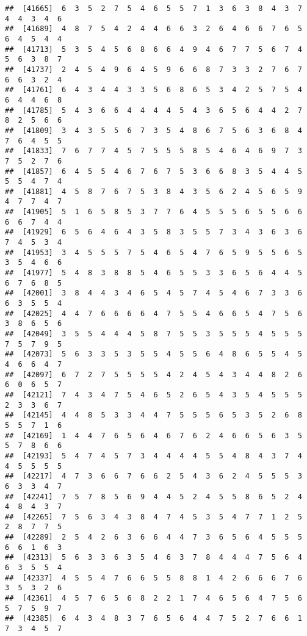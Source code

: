 \documentclass[
]{book}
\begin{document}
\begin{verbatim}
##  [41665]  6  3  5  2  7  5  4  6  5  5  7  1  3  6  3  8  4  3  7  4  4  3  4  6
##  [41689]  4  8  7  5  4  2  4  4  6  6  3  2  6  4  6  6  7  6  5  6  4  5  4  4
##  [41713]  5  3  5  4  5  6  8  6  6  4  9  4  6  7  7  5  6  7  4  5  6  3  8  7
##  [41737]  2  4  5  4  9  6  4  5  9  6  6  8  7  3  3  2  7  6  7  6  6  3  2  4
##  [41761]  6  4  3  4  4  3  3  5  6  8  6  5  3  4  2  5  7  5  4  6  4  4  6  8
##  [41785]  5  4  3  6  6  4  4  4  4  5  4  3  6  5  6  4  4  2  7  8  2  5  6  6
##  [41809]  3  4  3  5  5  6  7  3  5  4  8  6  7  5  6  3  6  8  4  7  6  4  5  5
##  [41833]  7  6  7  7  4  5  7  5  5  5  8  5  4  6  4  6  9  7  3  7  5  2  7  6
##  [41857]  6  4  5  5  4  6  7  6  7  5  3  6  6  8  3  5  4  4  5  5  5  4  7  4
##  [41881]  4  5  8  7  6  7  5  3  8  4  3  5  6  2  4  5  6  5  9  4  7  7  4  7
##  [41905]  5  1  6  5  8  5  3  7  7  6  4  5  5  5  6  5  5  6  6  6  6  7  4  4
##  [41929]  6  5  6  4  6  4  3  5  8  3  5  5  7  3  4  3  6  3  6  7  4  5  3  4
##  [41953]  3  4  5  5  5  7  5  4  6  5  4  7  6  5  9  5  5  6  5  3  5  4  6  6
##  [41977]  5  4  8  3  8  8  5  4  6  5  5  3  3  6  5  6  4  4  5  6  7  6  8  5
##  [42001]  3  8  4  4  3  4  6  5  4  5  7  4  5  4  6  7  3  3  6  6  3  5  5  4
##  [42025]  4  4  7  6  6  6  6  4  7  5  5  4  6  6  5  4  7  5  6  3  8  6  5  6
##  [42049]  3  5  5  4  4  4  5  8  7  5  5  3  5  5  5  4  5  5  5  7  5  7  9  5
##  [42073]  5  6  3  3  5  3  5  5  4  5  5  6  4  8  6  5  5  4  5  4  6  6  4  7
##  [42097]  6  7  2  7  5  5  5  5  4  2  4  5  4  3  4  4  8  2  6  6  0  6  5  7
##  [42121]  7  4  3  4  7  5  4  6  5  2  6  5  4  3  5  4  5  5  5  2  3  3  6  7
##  [42145]  4  4  8  5  3  3  4  4  7  5  5  5  6  5  3  5  2  6  8  5  5  7  1  6
##  [42169]  1  4  4  7  6  5  6  4  6  7  6  2  4  6  6  5  6  3  5  5  7  8  6  6
##  [42193]  5  4  7  4  5  7  3  4  4  4  4  5  5  4  8  4  3  7  4  4  5  5  5  5
##  [42217]  4  7  3  6  6  7  6  6  2  5  4  3  6  2  4  5  5  5  3  6  3  3  4  7
##  [42241]  7  5  7  8  5  6  9  4  4  5  2  4  5  5  8  6  5  2  4  4  8  4  3  7
##  [42265]  7  5  6  3  4  3  8  4  7  4  5  3  5  4  7  7  1  2  5  2  8  7  7  5
##  [42289]  2  5  4  2  6  3  6  6  4  4  7  3  6  5  6  4  5  5  5  6  6  1  6  3
##  [42313]  5  6  3  3  6  3  5  4  6  3  7  8  4  4  4  7  5  6  4  6  3  5  5  4
##  [42337]  4  5  5  4  7  6  6  5  5  8  8  1  4  2  6  6  6  7  6  3  5  3  2  6
##  [42361]  4  5  7  6  5  6  8  2  2  1  7  4  6  5  6  4  7  5  6  5  7  5  9  7
##  [42385]  6  4  3  4  8  3  7  6  5  6  4  4  7  5  2  7  6  6  1  7  3  4  5  7

\end{verbatim}
\end{document}
